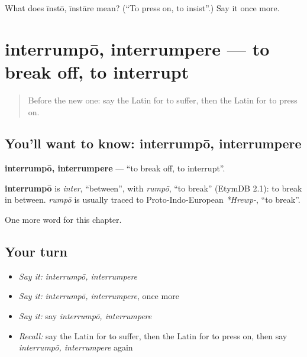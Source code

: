 \begin{tcolorbox}[breakable,colback=teal!4,colframe=teal!35!black,title={Before you move on}]
What does īnstō, īnstāre mean? (\textquotedblleft{}To press on, to insist\textquotedblright{}.) Say it once more.
\end{tcolorbox}
\section[interrumpō, interrumpere]{interrumpō, interrumpere — to break off, to interrupt}

\label{lesson:LA-C233-interrumpo}



\begin{quote}
Before the new one: say the Latin for to suffer, then the Latin for to press on.
\end{quote}

\subsection*{You'll want to know: interrumpō, interrumpere}
\textbf{interrumpō, interrumpere} — \textquotedblleft{}to break off, to interrupt\textquotedblright{}.

\begin{cousinweb}
\textbf{interrumpō} is \emph{inter}, \textquotedblleft{}between\textquotedblright{}, with \emph{rumpō}, \textquotedblleft{}to break\textquotedblright{} (EtymDB 2.1): to break in between. \emph{rumpō} is usually traced to Proto-Indo-European \emph{*Hrewp-}, \textquotedblleft{}to break\textquotedblright{}.
\end{cousinweb}

\begin{grammarlens}[title={What you've built}]
One more word for this chapter.
\end{grammarlens}

\subsection*{Your turn}
\begin{itemize}
\raggedright
  \item \emph{Say it:} \emph{interrumpō, interrumpere}
  \item \emph{Say it:} \emph{interrumpō, interrumpere}, once more
  \item \emph{Say it:} say \emph{interrumpō, interrumpere}
  \item \emph{Recall:} say the Latin for to suffer, then the Latin for to press on, then say \emph{interrumpō, interrumpere} again
\end{itemize}

